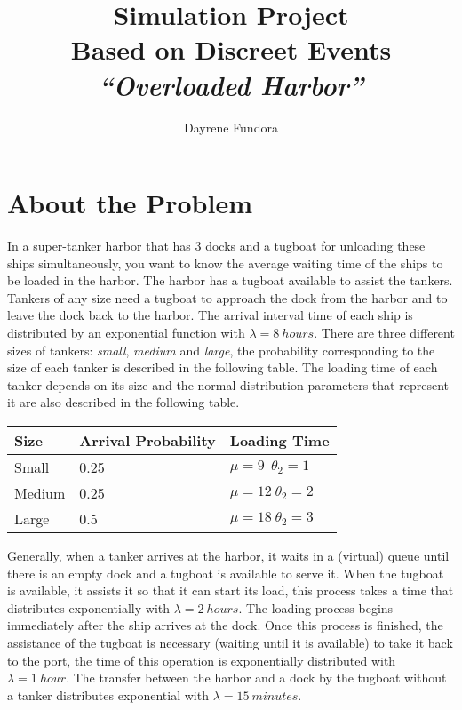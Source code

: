 \documentclass{llncs}
\begin{document}
\title{{\huge Simulation Project}\\ {\small Based on Discreet Events}\\\emph{``Overloaded Harbor''}}

\author{
  Dayrene Fundora 
  }



\maketitle

\section{About the Problem}
In a super-tanker harbor that has 3 docks and a tugboat for unloading these ships simultaneously, you want to know the average waiting time of the ships to be loaded in the harbor.
The harbor has a tugboat available to assist the tankers. Tankers of any size need a tugboat to approach the dock from the harbor and to leave the dock back to the harbor.
The arrival interval time of each ship is distributed by an exponential function with $\lambda = 8~hours$. There are three different sizes of tankers: \emph{small}, \emph{medium} and \emph{large}, the probability corresponding to the size of each tanker is described in the following table. The loading time of each tanker depends on its size and the normal distribution parameters that represent it are also described in the following table.\\
\begin{center}
	\begin{tabular}{ l | l | l }
	
	Size& Arrival Probability  & Loading Time \\ \hline
	Small& 0.25 & $\mu = 9  ~~ \theta_{2} = 1$ \\ 
	Medium& 0.25 & $\mu = 12 ~ \theta_{2} = 2$ \\ 
	Large& 0.5 & $\mu = 18 ~ \theta_{2} = 3$\\ 
	\end{tabular}
\end{center}

Generally, when a tanker arrives at the harbor, it waits in a (virtual) queue until there is an empty dock and a tugboat is available to serve it. When the tugboat is available, it assists it so that it can start its load, this process takes a time that distributes exponentially with $\lambda = 2~hours$. The loading process begins immediately after the ship arrives at the dock. Once this process is finished, the assistance of the tugboat is necessary (waiting until it is available) to take it back to the port, the time of this operation is exponentially distributed with $\lambda = 1~hour$. The transfer between the harbor and a dock by the tugboat without a tanker distributes exponential with $\lambda = 15~minutes$.\\
\end{document}
